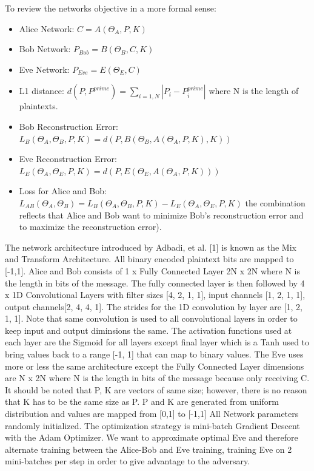 \documentclass[12pt]{article}
\begin{document}
To review the networks objective in a more formal sense:
\begin{itemize}
\item Alice Network: $C = A(\Theta_{A}, P, K)$
\item Bob Network: $P_{Bob} = B(\Theta_{B}, C, K)$
\item Eve Network: $P_{Eve} = E(\Theta_{E}, C)$
\item L1 distance: $d(P, P^{prime}) = \sum_{i=1, N}|P_{i}-P^{prime}_{i}|$ where N is the length of plaintexts.
\item Bob Reconstruction Error: $L_{B}(\Theta_{A}, \Theta_{B}, P, K) = d(P, B(\Theta_{B}, A(\Theta_{A}, P, K), K))$
\item Eve Reconstruction Error: $L_{E}(\Theta_{A}, \Theta_{E}, P, K) = d(P, E(\Theta_{E}, A(\Theta_{A}, P, K)))$
\item Loss for Alice and Bob: $L_{AB}(\Theta_{A}, \Theta_{B}) = L_{B}(\Theta_{A}, \Theta_{B}, P, K) -  L_{E}(\Theta_{A}, \Theta_{E}, P, K)$ the combination reflects that Alice and Bob want to minimize Bob’s reconstruction error and to maximize the reconstruction error).
\end{itemize}

The network architecture introduced by Adbadi, et al. [1] is known as the Mix and Transform Architecture. All binary encoded plaintext bits are mapped to [-1,1]. Alice and Bob consists of 1 x Fully Connected Layer 2N x 2N where N is the length in bits of the message. The fully connected layer is then followed by 4 x 1D Convolutional Layers with filter sizes [4, 2, 1, 1], input channels [1, 2, 1, 1], output channels[2, 4, 4, 1]. The strides for the 1D convolution by layer are [1, 2, 1, 1]. Note that same convolution is used to all convolutional layers in order to keep input and output diminsions the same. The activation functions used at each layer are the Sigmoid for all layers except final layer which is a Tanh used to bring values back to a range [-1, 1] that can map to binary values. The Eve uses more or less the same architecture except the Fully Connected Layer dimensions are N x 2N where N is the length in bits of the message because only receiving C. It should be noted that P, K are vectors of same size; however, there is no reason that K has to be the same size as P. P and K are generated from uniform distribution and values are mapped from [0,1] to [-1,1] All Network parameters randomly initialized.
The optimization strategy is mini-batch Gradient Descent with the Adam Optimizer. We want to approximate optimal Eve and therefore alternate training between the Alice-Bob and Eve training, training Eve on 2 mini-batches per step in order to give advantage to the adversary.
\end{document}
